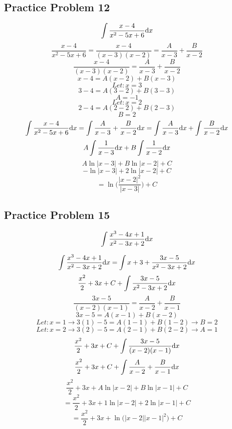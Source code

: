 \documentclass[letterpaper, 12pt]{math}
\begin{document}
\subsection*{Practice Problem 12}
\[ \int{\frac{x-4}{x^{2}-5x+6}\mathrm{d}{x}} \]
\[ \frac{x-4}{x^{2}-5x+6} =
   \frac{x-4}{(x-3)(x-2)} = \frac{A}{x-3}+\frac{B}{x-2} \]
\[ \frac{x-4}{(x-3)(x-2)} = \frac{A}{x-3}+\frac{B}{x-2} \]
\[ x-4 = A(x-2)+B(x-3) \]
\[ Let: x = 3 \]
\[ 3-4 = A(3-2)+B(3-3) \]
\[ A = -1 \]
\[ Let: x = 2 \]
\[ 2-4 = A(2-2)+B(2-3) \]
\[ B = 2 \]
\[ \int{\frac{x-4}{x^{2}-5x+6}\mathrm{d}{x}} =
   \int{\frac{A}{x-3}+\frac{B}{x-2}\mathrm{d}{x}} =
   \int{\frac{A}{x-3}\mathrm{d}{x}}+\int{\frac{B}{x-2}\mathrm{d}{x}} \]
\[ A\int{\frac{1}{x-3}\mathrm{d}{x}}+B\int{\frac{1}{x-2}\mathrm{d}{x}} \]
\[ A\ln|x-3|+B\ln|x-2|+C \]
\[ -\ln|x-3|+2\ln|x-2|+C \]
\[ = \ln\bigg(\frac{|x-2|^{2}}{|x-3|}\bigg)+C \]

\subsection*{Practice Problem 15}
\[ \int{\frac{x^{3}-4x+1}{x^{2}-3x+2}\mathrm{d}{x}} \]
\begin{center}
\end{center}
\[ \int{\frac{x^{3}-4x+1}{x^{2}-3x+2}\mathrm{d}{x}} =
   \int{x+3+\frac{3x-5}{x^{2}-3x+2}\mathrm{d}{x}} \]
\[ \frac{x^{2}}{2}+3x+C+\int{\frac{3x-5}{x^{2}-3x+2}\mathrm{d}{x}} \]
\[ \frac{3x-5}{(x-2)(x-1)} = \frac{A}{x-2}+\frac{B}{x-1} \]
\[ 3x-5 = A(x-1)+B(x-2) \]
\[ Let: x = 1 \rightarrow 3(1)-5 = A(1-1)+B(1-2) \rightarrow B = 2 \]
\[ Let: x = 2 \rightarrow 3(2)-5 = A(2-1)+B(2-2) \rightarrow A = 1 \]
\[ \frac{x^{2}}{2}+3x+C+\int{\frac{3x-5}{(x-2)(x-1)}\mathrm{d}{x}} \]
\[ \frac{x^{2}}{2}+3x+C+\int{\frac{A}{x-2}+\frac{B}{x-1}\mathrm{d}{x}} \]
\[ \frac{x^{2}}{2}+3x+A\ln|x-2|+B\ln|x-1|+C \]
\[ = \frac{x^{2}}{2}+3x+1\ln|x-2|+2\ln|x-1|+C \]
\[ = \frac{x^{2}}{2}+3x+\ln\bigg(|x-2||x-1|^{2}\bigg)+C \]
\end{document}
